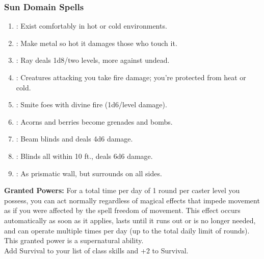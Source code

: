 \subsubsection{Sun Domain Spells}
\begin{enumerate}
	\item{:} Exist comfortably in hot or cold environments.
	\item{:} Make metal so hot it damages those who touch it.
	\item{:} Ray deals 1d8/two levels, more against undead.
	\item{:} Creatures attacking you take fire damage; you’re protected from heat or cold.
	\item{:} Smite foes with divine fire (1d6/level damage).
	\item{:} Acorns and berries become grenades and bombs.
	\item{:} Beam blinds and deals 4d6 damage.
	\item{:} Blinds all within 10 ft., deals 6d6 damage.
	\item{:} As prismatic wall, but surrounds on all sides.
\end{enumerate}

\textbf{Granted Powers:} For a total time per day of 1 round per caster level you possess, you can act normally regardless of magical effects that impede movement as if you were affected by the spell freedom of movement. This effect occurs automatically as soon as it applies, lasts until it runs out or is no longer needed, and can operate multiple times per day (up to the total daily limit of rounds). This granted power is a supernatural ability.
\\Add Survival to your list of class skills and +2 to Survival.
